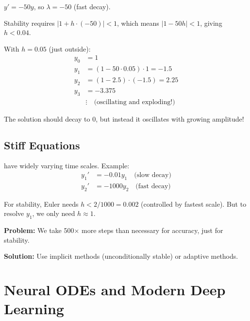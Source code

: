  $y' = -50y$, so $\lambda = -50$ (fast decay).

Stability requires $|1 + h \cdot (-50)| < 1$, which means $|1 - 50h| < 1$, giving $h < 0.04$.

With $h = 0.05$ (just outside):
\begin{align*}
    y_0 &= 1 \\
    y_1 &= (1 - 50 \cdot 0.05) \cdot 1 = -1.5 \\
    y_2 &= (1 - 2.5) \cdot (-1.5) = 2.25 \\
    y_3 &= -3.375 \\
    &\vdots \quad \text{(oscillating and exploding!)}
\end{align*}


The solution should decay to 0, but instead it oscillates with growing amplitude!


\subsection{Stiff Equations}

 have widely varying time scales. Example:
\begin{align}
    y_1' &= -0.01 y_1 \quad \text{(slow decay)} \\
    y_2' &= -1000 y_2 \quad \text{(fast decay)}
\end{align}

For stability, Euler needs $h < 2/1000 = 0.002$ (controlled by fastest scale).
But to resolve $y_1$, we only need $h \approx 1$.


\textbf{Problem:} We take 500$\times$ more steps than necessary for accuracy, just for stability.

\textbf{Solution:} Use implicit methods (unconditionally stable) or adaptive methods.




\newpage
\section{Neural ODEs and Modern Deep Learning}

